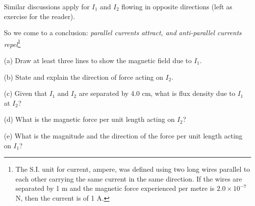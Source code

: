 Similar discussions apply for $I_1$ and $I_2$ flowing in opposite directions (left as exercise for the reader).

So we come to a conclusion: \emph{parallel currents attract, and anti-parallel currents repel}\footnote{The S.I. unit for current, ampere, was defined using two long wires parallel to each other carrying the same current in the same direction. If the wires are separated by 1 m and the magnetic force experienced per metre is $2.0\times10^{-7}$ N, then the current is of 1 A.}


\label{q-pwires}



\begin{figure}[htp]
\centering
{}
\end{figure}

\begin{compactenum}
\item[(a)] Draw at least three lines to show the magnetic field due to $I_1$.

\item[(b)] State and explain the direction of force acting on $I_2$.

\item[(c)] Given that $I_1$ and $I_2$ are separated by 4.0 cm, what is flux density due to $I_1$ at $I_2$?

\item[(d)]  What is the magnetic force per unit length acting on $I_2$?

\item[(e)] What is the magnitude and the direction of the force per unit length acting on $I_1$?
	
\end{compactenum}

